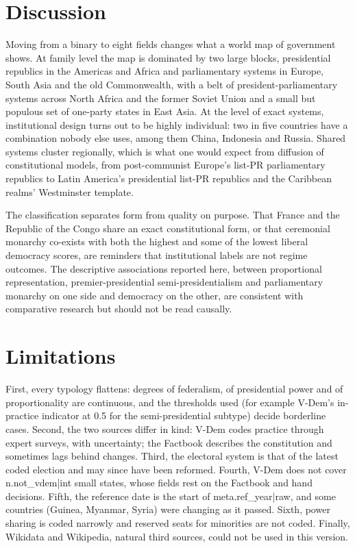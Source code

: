 \documentclass[11pt,a4paper]{article}
\begin{document}
\section{Discussion}
Moving from a binary to eight fields changes what a world map of government shows. At family level the map is dominated by two large blocks, presidential republics in the Americas and Africa and parliamentary systems in Europe, South Asia and the old Commonwealth, with a belt of president-parliamentary systems across North Africa and the former Soviet Union and a small but populous set of one-party states in East Asia. At the level of exact systems, institutional design turns out to be highly individual: two in five countries have a combination nobody else uses, among them China, Indonesia and Russia. Shared systems cluster regionally, which is what one would expect from diffusion of constitutional models, from post-communist Europe's list-PR parliamentary republics to Latin America's presidential list-PR republics and the Caribbean realms' Westminster template.

The classification separates form from quality on purpose. That France and the Republic of the Congo share an exact constitutional form, or that ceremonial monarchy co-exists with both the highest and some of the lowest liberal democracy scores, are reminders that institutional labels are not regime outcomes. The descriptive associations reported here, between proportional representation, premier-presidential semi-presidentialism and parliamentary monarchy on one side and democracy on the other, are consistent with comparative research but should not be read causally.

\section{Limitations}
First, every typology flattens: degrees of federalism, of presidential power and of proportionality are continuous, and the thresholds used (for example V-Dem's in-practice indicator at 0.5 for the semi-presidential subtype) decide borderline cases. Second, the two sources differ in kind: V-Dem codes practice through expert surveys, with uncertainty; the Factbook describes the constitution and sometimes lags behind changes. Third, the electoral system is that of the latest coded election and may since have been reformed. Fourth, V-Dem does not cover {{n.not_vdem|int}} small states, whose fields rest on the Factbook and hand decisions. Fifth, the reference date is the start of {{meta.ref_year|raw}}, and some countries (Guinea, Myanmar, Syria) were changing as it passed. Sixth, power sharing is coded narrowly and reserved seats for minorities are not coded. Finally, Wikidata and Wikipedia, natural third sources, could not be used in this version.
\end{document}
